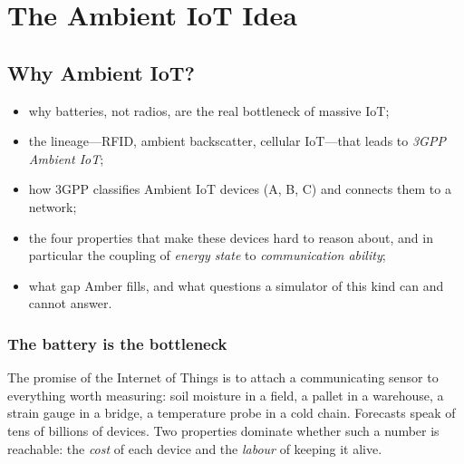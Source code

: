 \part{The Ambient IoT Idea}

\chapter{Why Ambient IoT?}
\label{ch:intro}

\begin{defbox}
\begin{itemize}
 \item why batteries, not radios, are the real bottleneck of massive IoT;
 \item the lineage---RFID, ambient backscatter, cellular IoT---that leads to \emph{3GPP Ambient IoT};
 \item how 3GPP classifies Ambient IoT devices (A, B, C) and connects them to a network;
 \item the four properties that make these devices hard to reason about, and in particular the coupling of \emph{energy state} to \emph{communication ability};
 \item what gap Amber fills, and what questions a simulator of this kind can and cannot answer.
\end{itemize}
\end{defbox}

\section{The battery is the bottleneck}

The promise of the Internet of Things is to attach a communicating sensor to
everything worth measuring: soil moisture in a field, a pallet in a warehouse,
a strain gauge in a bridge, a temperature probe in a cold chain. Forecasts
speak of tens of billions of devices. Two properties dominate whether such a
number is reachable: the \emph{cost} of each device and the \emph{labour} of
keeping it alive.

